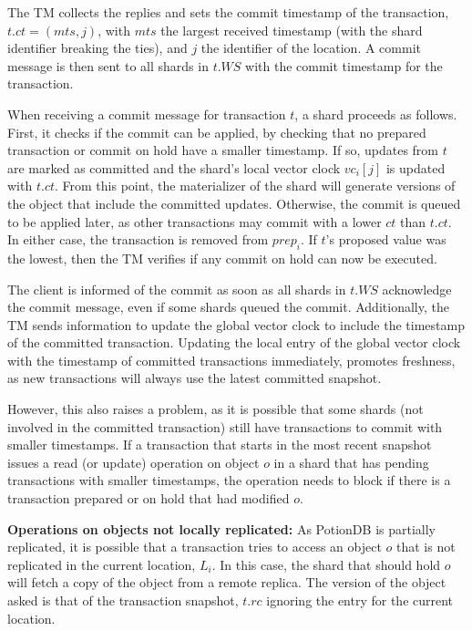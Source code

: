 \documentclass[sigconf, nonacm]{acmart}
\begin{document}
The TM collects the replies and sets the commit timestamp of the transaction,  $t\!.\mathit{ct} = (\mathit{mts}, j)$,
with $\mathit{mts}$ the largest received timestamp (with the shard identifier breaking the ties), and $j$ the 
identifier of the location.
A commit message is then sent to all shards in $t.WS$ with the commit timestamp for the transaction.

When receiving a commit message for transaction $t$, a shard proceeds as follows.
First, it checks if the commit can be applied,  by checking that no prepared transaction or commit on hold have a 
smaller timestamp.
If so, updates from $t$ are marked as committed and the shard's local vector clock $\mathit{vc}_i[j]$ is 
updated with $t\!.\mathit{ct}$. From this point, the materializer of the shard will generate versions of the object that
include the committed updates.
Otherwise, the commit is queued to be applied later, as other transactions may commit with a lower
$\mathit{ct}$ than $t\!.\mathit{ct}$.
In either case,  the transaction is removed from $\mathit{prep}_i$. If $t$'s proposed value was the lowest, 
then the TM verifies if any commit on hold can now be executed.

The client is informed of the commit as soon as all shards in $t.WS$ acknowledge the commit message, even if 
some shards queued the commit. Additionally, the TM sends information to update the global vector clock to
include the timestamp of the committed transaction.
Updating the local entry of the global vector clock with the timestamp of committed transactions immediately, 
promotes freshness, as new transactions will always use the latest committed snapshot.

However, this also raises a problem, as it is possible that some shards (not involved in the committed transaction) 
still have transactions to commit with smaller timestamps. 
If a transaction that starts in the most recent snapshot issues a read (or update) operation on object $o$ in a shard that has
pending transactions with smaller timestamps, the operation needs to block if there is a transaction prepared or on hold 
that had modified $o$. 

\noindent
\textbf{Operations on objects not locally replicated:}
As PotionDB is partially replicated, it is possible that a transaction tries to access an object $o$
that is not replicated in the current location, $L_i$. In this case, the shard that should hold $o$ 
will fetch a copy of the object from a remote replica. The version of the object asked is that
of the transaction snapshot,  $t\!.\mathit{rc}$ ignoring the entry for the current location.
\end{document}
